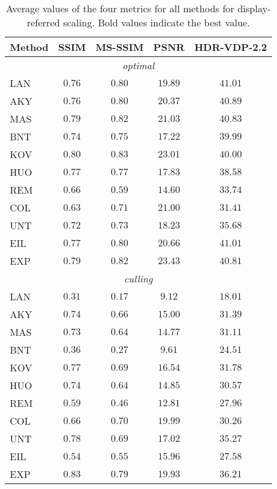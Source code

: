 \documentclass{egpubl}
\newcommand\la[1]{\multicolumn{1}{l}{#1}}
\begin{document}
\begin{table}[tbp]
    \caption{Average values of the four metrics for all methods for
    display-referred scaling. Bold values indicate the best
    value.}\label{table:resultsdisplay}
    \centering
    \begin{tabular}{lcccc}
        \toprule
        \la{{Method}}&SSIM&MS-SSIM&PSNR&HDR-VDP-2.2\\\midrule
\multicolumn{5}{c}{\textit{optimal}} \\\midrule
        \la{LAN}&$0.76$&$0.80$&$19.89$&$\mathbf{41.01}$\\
        \la{AKY}&$0.76$&$0.80$&$20.37$&$40.89$\\
        \la{MAS}&$0.79$&$ 0.82 $&$21.03$&$40.83$\\
        \la{BNT}&$0.74$&$0.75$&$17.22$&$39.99$\\
        \la{KOV}&$\mathbf{0.80}$&$ \mathbf{0.83}$&$23.01$&$40.00$\\
        \la{HUO}&$0.77$&$0.77$&$17.83$&$38.58$\\
        \la{REM}&$0.66$&$0.59$&$14.60$&$33.74$\\
        \la{COL}&$0.63$&$0.71$&$21.00$&$31.41$\\
        \la{UNT}&$0.72$&$0.73$&$18.23$&$35.68$\\
        \la{EIL}&$0.77$&$0.80$&$20.66$&$\mathbf{41.01}$\\
        \la{EXP}&$0.79$&$ 0.82$&$\mathbf{23.43}$&$40.81$\\\midrule
\multicolumn{5}{c}{\textit{culling}} \\\midrule
        \la{LAN}&$0.31$&$0.17$&$9.12$&$18.01$\\
        \la{AKY}&$0.74$&$0.66$&$15.00$&$31.39$\\
        \la{MAS}&$0.73$&$0.64$&$14.77$&$31.11$\\
        \la{BNT}&$0.36$&$0.27$&$9.61$&$24.51$\\
        \la{KOV}&$0.77$&$0.69$&$16.54$&$31.78$\\
        \la{HUO}&$0.74$&$0.64$&$14.85$&$30.57$\\
        \la{REM}&$0.59$&$0.46$&$12.81$&$27.96$\\
        \la{COL}&$0.66$&$0.70$&$\mathbf{19.99}$&$30.26$\\
        \la{UNT}&$0.78$&$0.69$&$17.02$&$35.27$\\
        \la{EIL}&$0.54$&$0.55$&$15.96$&$27.58$\\
        \la{EXP}&$\mathbf{0.83}$&$\mathbf{0.79}$&$19.93$&$\mathbf{36.21}$\\
        \bottomrule
    \end{tabular}
\end{table}
\end{document}

